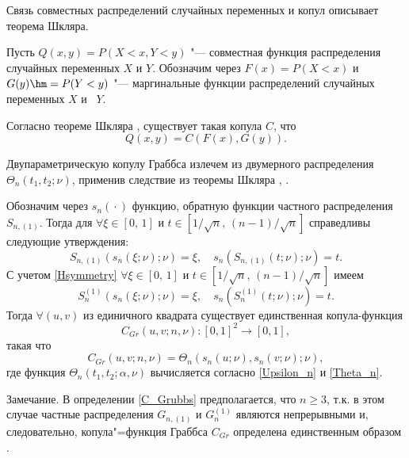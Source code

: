 \smallskip


 Связь совместных распределений случайных переменных и копул описывает теорема Шкляра.

Пусть $Q(x,y)=P(X<x,Y<y)$   "---  совместная функция распределения случайных переменных  $X$ и  $Y$.
Обозначим через $F(x)=P(X<x)$  и  $G(y)\hm =P(Y<y)$  "--- маргинальные   функции распределений случайных переменных  $X$ и~ $Y$.

Согласно теореме Шкляра \cite[p.~18, Theorem 2.3.3]{Nelsen}, существует такая копула $C$, что
\begin{equation*}\label{COPULA}
 Q(x,y)=C(F(x),G(y)).
\end{equation*}

Двупараметрическую копулу Граббса излечем из двумерного распределения $\Theta_n(t_1,t_2;\nu)$, применив следствие из теоремы Шкляра \cite[p.~22, Corollary 2.3.7]{Nelsen}, \cite{Fant}.

Обозначим через $s_{n}({}\cdot{})$ функцию, обратную функции частного распределения $S_{n,(1)}$.
Тогда для  $\forall \xi\in[0,\,1]$ и $t\in\left[1/\sqrt{n},\,(n-1)/\sqrt{n}\right]$ справедливы следующие утверждения:
\begin{equation*}
\label{Inverse1}
S_{n,(1)}(s_{n}(\xi;\nu);\nu)=\xi, \quad  s_{n}(S_{n,(1)}(t;\nu);\nu) =t.
\end{equation*}
С учетом \eqref{Hsymmetry}  $\forall \xi\in[0,\,1]$ и $t\in\left[1/\sqrt{n},\,(n-1)/\sqrt{n}\right]$ имеем
\begin{equation*}
\label{Inverse2}
S_{n}^{(1)}(s_{n}(\xi;\nu);\nu)=\xi, \quad   s_{n}(S_{n}^{(1)}(t;\nu);\nu) =t.
\end{equation*}
 Тогда $\forall (u,v)$ из единичного квадрата существует единственная
  копула-функция 
   $$
   C_{Gr}(u,v;n,\nu):[0, 1]^2\to[0, 1],$$ 
такая что
 \begin{equation}\label{C_Grubbs}
C_{Gr}(u,v;n,\nu)=\Theta_n(s_{n}(u;\nu),s_n(v;\nu);\nu),
\end{equation}
где  функция $\Theta_n(t_1,t_2;\alpha,\nu)$
 вычисляется согласно \eqref{Upsilon_n}  и  \eqref{Theta_n}.

\smallskip

{\small \sc Замечание.} В определении \eqref{C_Grubbs} предполагается, что $n\ge 3$, т.к.
 в этом случае частные распределения $G_{n,(1)}$ и $G_n^{(1)}$ являются непрерывными и, следовательно,
 копула"=функция  Граббса $C_{Gr}$  определена единственным образом \cite[p.~18]{Nelsen}.

\smallskip 
 
